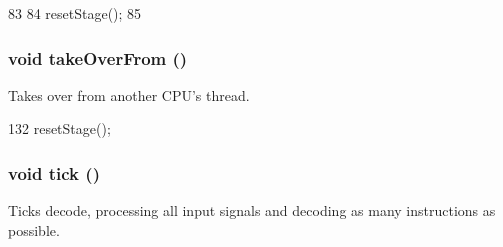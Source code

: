 \begin{DoxyCode}
83 {
84     resetStage();
85 }
\end{DoxyCode}
\hypertarget{classDefaultDecode_a8674059ce345e23aac5086b2c3e24a43}{
\subsubsection[{takeOverFrom}]{\setlength{\rightskip}{0pt plus 5cm}void takeOverFrom ()}}
\label{classDefaultDecode_a8674059ce345e23aac5086b2c3e24a43}
Takes over from another CPU's thread. 


\begin{DoxyCode}
132 { resetStage(); }
\end{DoxyCode}
\hypertarget{classDefaultDecode_a873dd91783f9efb4a590aded1f70d6b0}{
\subsubsection[{tick}]{\setlength{\rightskip}{0pt plus 5cm}void tick ()}}
\label{classDefaultDecode_a873dd91783f9efb4a590aded1f70d6b0}
Ticks decode, processing all input signals and decoding as many instructions as possible. 


